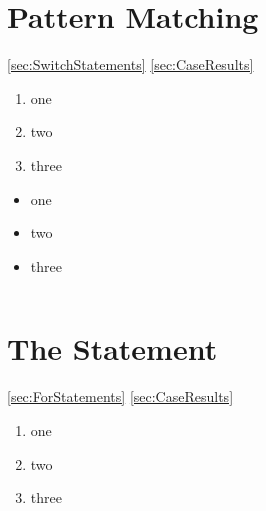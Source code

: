 

\section{Pattern Matching}\label{sec:PatternMatching}

\ref{sec:SwitchStatements}
\ref{sec:CaseResults}
\autocite{ORACLE_DOC_PATTERNMATCHING}

\autocite{ORACLE_DOC_LANGUAGE_SPECIFICATION:SwitchExpression, ORACLE_DOC_LANGUAGE_SPECIFICATION:SwitchExpressionBlock, ORACLE_DOC_SWITCHEXPRESSIONS}



\lipsum[1]

\begin{enumerate}[label=P\arabic*.]
\item{one}
\item{two}
\item{three}
\end{enumerate}

\begin{itemize}[nosep]
\item{one}
\item{two}
\item{three}
\end{itemize}

\begin{lstlisting}[numbers=left]
\end{lstlisting}


\section{The  Statement}\label{sec:TheForStatement}

\ref{sec:ForStatements}
\ref{sec:CaseResults}
\autocite{ORACLE_DOC_PATTERNMATCHING}

\autocite{ORACLE_DOC_LANGUAGE_SPECIFICATION:For, ORACLE_DOC_LANGUAGE_SPECIFICATION:ForBasic, ORACLE_DOC_LANGUAGE_SPECIFICATION:ForEnhanced}


\autocite{}

\lipsum[1]

\begin{enumerate}[label=P\arabic*.]
\item{one}
\item{two}
\item{three}
\end{enumerate}

